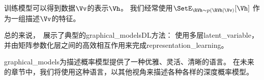 训练模型可以得到数据$\Vv$的表示$\Vh$。
我们经常使用$\SetE_{\RVh\sim p(\RVh\mid\Vv)}[\Vh]$ 作为一组描述$\Vv$的特征。



总的来说，~展示了典型的\gls{graphical_models}\gls{DL}方法：
使用多层\gls{latent_variable}，并由矩阵参数化层之间的高效相互作用来完成\gls{representation_learning}。


\gls{graphical_models}为描述概率模型提供了一种优雅、灵活、清晰的语言。 
在未来的章节中，我们将使用这种语言，以其他视角来描述各种各样的深度概率模型。




